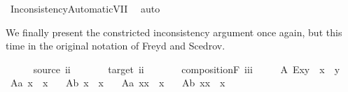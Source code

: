 \begin{isabellebody}
\ InconsistencyAutomaticVII\ \isamarkupfalse%
\ auto%
\endisatagproof
{\isafoldproof}%
%
\isadelimproof
%
\endisadelimproof
%
\begin{isamarkuptext}%
We finally present the constricted inconsistency argument once again, but this time in the original
  notation of Freyd and Scedrov.%
\end{isamarkuptext}\isamarkuptrue%
\isamarkupfalse%
\ \ \isanewline
\ \ \ source{\isacharcolon}{\isacharcolon}\ {\isachardoublequoteopen}i{\isasymRightarrow}i{\isachardoublequoteclose}\ {\isacharparenleft}{\isachardoublequoteopen}{\isasymbox}{\isacharunderscore}{\isachardoublequoteclose}\ {\isacharbrackleft}{}{}{}{\isacharbrackright}\ {}{}{}{\isacharparenright}\ \isanewline
\ \ \ target{\isacharcolon}{\isacharcolon}\ {\isachardoublequoteopen}i{\isasymRightarrow}i{\isachardoublequoteclose}\ {\isacharparenleft}{\isachardoublequoteopen}{\isacharunderscore}{\isasymbox}{\isachardoublequoteclose}\ {\isacharbrackleft}{}{}{}{\isacharbrackright}\ {}{}{}{\isacharparenright}\ \isanewline
\ \ \ compositionF{\isacharcolon}{\isacharcolon}\ {\isachardoublequoteopen}i{\isasymRightarrow}i{\isasymRightarrow}i{\isachardoublequoteclose}\ {\isacharparenleft}\ {\isachardoublequoteopen}\isactrlbold {\isasymcdot}{\isachardoublequoteclose}\ {}{}{}{\isacharparenright}\isanewline
\isanewline
\isanewline
\ \ A{}{\isacharcolon}\ {\isachardoublequoteopen}E{\isacharparenleft}x\isactrlbold {\isasymcdot}y{\isacharparenright}\ \isactrlbold {\isasymleftrightarrow}\ {\isacharparenleft}x{\isasymbox}\ {\isasymcong}\ {\isasymbox}y{\isacharparenright}{\isachardoublequoteclose}\ \ \isanewline
\ A{}a{\isacharcolon}\ {\isachardoublequoteopen}{\isacharparenleft}{\isacharparenleft}{\isasymbox}x{\isacharparenright}{\isasymbox}{\isacharparenright}\ {\isasymcong}\ {\isasymbox}x{\isachardoublequoteclose}\ \ \isanewline
\ A{}b{\isacharcolon}\ {\isachardoublequoteopen}{\isasymbox}{\isacharparenleft}x{\isasymbox}{\isacharparenright}\ {\isasymcong}\ {\isasymbox}x{\isachardoublequoteclose}\ \ \isanewline
\ A{}a{\isacharcolon}\ {\isachardoublequoteopen}{\isacharparenleft}{\isasymbox}x{\isacharparenright}\isactrlbold {\isasymcdot}x\ {\isasymcong}\ x{\isachardoublequoteclose}\ \ \isanewline
\ A{}b{\isacharcolon}\ {\isachardoublequoteopen}x\isactrlbold {\isasymcdot}{\isacharparenleft}x{\isasymbox}{\isacharparenright}\ {\isasymcong}\ x{\isachardoublequoteclose}\ \ \isanewline

\end{isabellebody}
